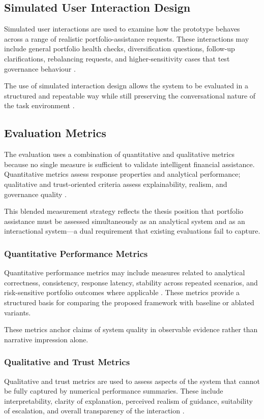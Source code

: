 \documentclass[11pt]{article}
\begin{document}
\subsection{Simulated User Interaction Design}
Simulated user interactions are used to examine how the prototype behaves across a range of realistic portfolio-assistance requests. These interactions may include general portfolio health checks, diversification questions, follow-up clarifications, rebalancing requests, and higher-sensitivity cases that test governance behaviour \cite{amershi2014,holzinger2016,cai2019}.

The use of simulated interaction design allows the system to be evaluated in a structured and repeatable way while still preserving the conversational nature of the task environment \cite{white2000}.

\subsection{Evaluation Metrics}
The evaluation uses a combination of quantitative and qualitative metrics because no single measure is sufficient to validate intelligent financial assistance. Quantitative metrics assess response properties and analytical performance; qualitative and trust-oriented criteria assess explainability, realism, and governance quality \cite{lo2002,arrieta2020,adadi2018}.

This blended measurement strategy reflects the thesis position that portfolio assistance must be assessed simultaneously as an analytical system and as an interactional system---a dual requirement that existing evaluations fail to capture.

\subsubsection{Quantitative Performance Metrics}
Quantitative performance metrics may include measures related to analytical correctness, consistency, response latency, stability across repeated scenarios, and risk-sensitive portfolio outcomes where applicable \cite{lo2002,white2000,rockafellar2000}. These metrics provide a structured basis for comparing the proposed framework with baseline or ablated variants.

These metrics anchor claims of system quality in observable evidence rather than narrative impression alone.

\subsubsection{Qualitative and Trust Metrics}
Qualitative and trust metrics are used to assess aspects of the system that cannot be fully captured by numerical performance summaries. These include interpretability, clarity of explanation, perceived realism of guidance, suitability of escalation, and overall transparency of the interaction \cite{ribeiro2016,lundberg2017,holzinger2016}.
\end{document}
